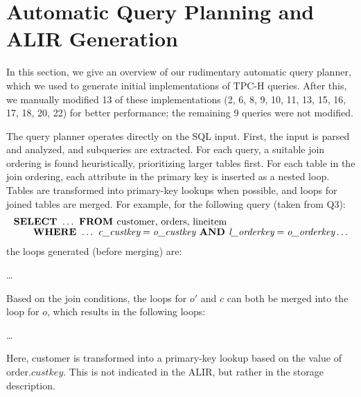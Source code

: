 \documentclass[acmsmall,screen,nonacm]{acmart}\settopmatter{printfolios=true,printccs=false,printacmref=false}
\begin{document}
\section{Automatic Query Planning and ALIR Generation}
In this section, we give an overview of our rudimentary automatic query planner, which we used to generate initial implementations of TPC-H queries. After this, we manually modified 13 of these implementations (2, 6, 8, 9, 10, 11, 13, 15, 16, 17, 18, 20, 22) for better performance; the remaining 9 queries were not modified.

The query planner operates directly on the SQL input. First, the input is parsed and analyzed, and subqueries are extracted. For each query, a suitable join ordering is found heuristically, prioritizing larger tables first. For each table in the join ordering, each attribute in the primary key is inserted as a nested loop. Tables are transformed into primary-key lookups when possible, and loops for joined tables are merged. For example, for the following query (taken from Q3):
\begin{align*}\footnotesize
    &\textbf{SELECT } \dots \textbf{ FROM } \textrm{customer, orders, lineitem} \\[-1ex]
    &\quad\quad \textbf{WHERE } \dots \textit{ c\_custkey} = \textit{o\_custkey} \textbf{ AND } \textit{l\_orderkey} = \textit{o\_orderkey} \dots
\end{align*}
the loops generated (before merging) are:
\begin{algorithmic}\footnotesize
                    \State \dots
                \EndALIRFor
            \EndALIRFor
        \EndALIRFor
    \EndALIRFor
\end{algorithmic}
Based on the join conditions, the loops for $o'$ and $c$ can both be merged into the loop for $o$, which results in the following loops:
\begin{algorithmic}\footnotesize
            \State \dots
        \EndALIRFor
    \EndALIRFor
\end{algorithmic}
Here, \textrm{customer} is transformed into a primary-key lookup based on the value of $\textrm{order}.\textit{custkey}$. This is not indicated in the ALIR, but rather in the storage description.
\end{document}
